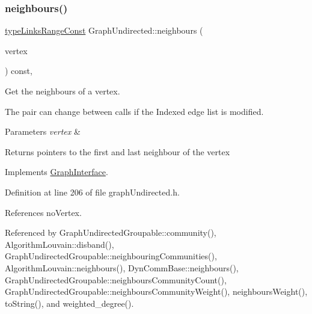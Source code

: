 \mbox{\label{classGraphUndirected_a5c8c85acc5ea87f43ac0dcbde61f06e0}} 
\subsubsection{\texorpdfstring{neighbours()}{neighbours()}}
{\footnotesize\ttfamily \hyperlink{graphInterface_8h_ae8d27008f15586bbf419af7ad2e0a48a}{type\+Links\+Range\+Const} Graph\+Undirected\+::neighbours (\begin{DoxyParamCaption}\item[{const \hyperlink{edge_8h_a5fbd20c46956d479cb10afc9855223f6}{type\+Vertex} \&}]{vertex }\end{DoxyParamCaption}) const\hspace{0.3cm}{\ttfamily [inline]}, {\ttfamily [virtual]}}



Get the neighbours of a vertex. 

The pair can change between calls if the Indexed edge list is modified. 
\begin{DoxyParams}{Parameters}
{\em vertex} & \\
\hline
\end{DoxyParams}
\begin{DoxyReturn}{Returns}
pointers to the first and last neighbour of the vertex 
\end{DoxyReturn}


Implements \hyperlink{classGraphInterface_a23e03d032193544c77d04310fe9e4785}{Graph\+Interface}.



Definition at line 206 of file graph\+Undirected.\+h.



References no\+Vertex.



Referenced by Graph\+Undirected\+Groupable\+::community(), Algorithm\+Louvain\+::disband(), Graph\+Undirected\+Groupable\+::neighbouring\+Communities(), Algorithm\+Louvain\+::neighbours(), Dyn\+Comm\+Base\+::neighbours(), Graph\+Undirected\+Groupable\+::neighbours\+Community\+Count(), Graph\+Undirected\+Groupable\+::neighbours\+Community\+Weight(), neighbours\+Weight(), to\+String(), and weighted\+\_\+degree().

\mbox{\label{classGraphUndirected_a6377b3a1a0d05fa1f96abb6e4b4b8792}} 
